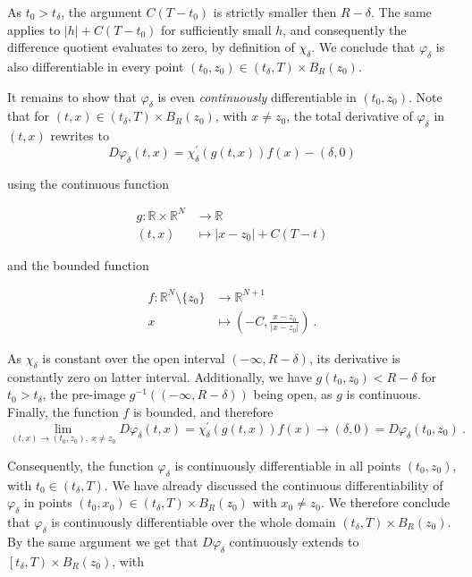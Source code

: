 As $ t_0 > t_{\delta} $, the argument $ C(T - t_0) $ is strictly smaller then $ R - \delta $. The same applies to $ \lvert h \rvert + C(T - t_0) $ for sufficiently small $ h $, and consequently the difference quotient evaluates to zero, by definition of $ \chi_{\delta} $. We conclude that $ \varphi_{\delta} $ is also differentiable in every point $ (t_0, z_0) \in \left(t_{\delta}, T \right) \times B_R (z_0) $.

It remains to show that $ \varphi_{\delta} $ is even \emph{continuously} differentiable in $ (t_0, z_0) $. Note that for $ (t, x)  \in \left(t_{\delta}, T\right) \times B_R (z_0) $, with $ x \neq z_0 $, the total derivative of $ \varphi_{\delta} $ in $ (t, x) $ rewrites to
\begin{equation*}
	D \varphi_{\delta} (t, x) = \chi_{\delta}^{\prime}(g(t, x))f(x) - \left(\delta, 0 \right)
\end{equation*}

using the continuous function

\begin{align*}
	g : \mathbb{R} \times \mathbb{R}^N &\to \mathbb{R} \\
	(t, x) &\mapsto \lvert x - z_0 \rvert + C(T - t)
\end{align*}

and the bounded function

\begin{align*}
	f : \mathbb{R}^N \setminus \{ z_0 \} &\to \mathbb{R}^{N + 1} \\
	x &\mapsto \left(-C, \frac{x - z_0}{\lvert x - z_0 \rvert}\right) \ .
\end{align*}

As $ \chi_{\delta} $ is constant over the open interval $ \left(- \infty, R - \delta \right) $, its derivative is constantly zero on latter interval. Additionally, we have $ g(t_0, z_0) < R - \delta $ for $ t_0 > t_{\delta} $, the pre-image $ g^{-1}((-\infty, R - \delta)) $ being open, as $ g $ is continuous. Finally, the function $ f $ is bounded, and therefore
\begin{equation*}
	\lim\limits_{(t, x) \to (t_0, z_0), \ x \neq z_0} D \varphi_{\delta}(t, x) = \chi_{\delta}^{\prime}(g(t, x))f(x) \to \left(\delta, 0 \right) = D \varphi_{\delta}(t_0, z_0) \ .
\end{equation*}

Consequently, the function $ \varphi_{\delta} $ is continuously differentiable in all points $ (t_0, z_0) $, with $ t_0 \in \left(t_{\delta}, T \right) $. We have already discussed the continuous differentiability of $ \varphi_{\delta} $ in points $ (t_0, x_0) \in \left(t_{\delta}, T \right) \times B_R (z_0) $ with $ x_0 \neq z_0 $. We therefore conclude that $ \varphi_{\delta} $ is continuously differentiable over the whole domain $ \left(t_{\delta}, T \right) \times B_R (z_0) $. By the same argument we get that $ D \varphi_{\delta} $ continuously extends to $ \left[t_{\delta}, T \right) \times B_R (z_0) $, with

